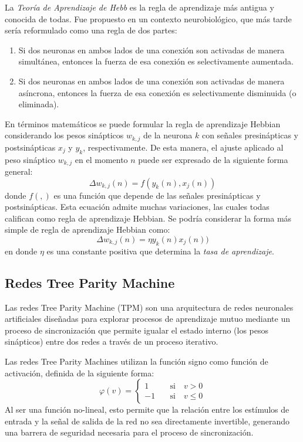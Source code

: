 La \textit{Teoría de Aprendizaje de Hebb} es la regla de aprendizaje más antigua y conocida de todas. Fue propuesto en un contexto neurobiológico, que más tarde sería reformulado como una regla de dos partes:
\begin{enumerate}
    \item Si dos neuronas en ambos lados de una conexión son activadas de manera simultánea, entonces la fuerza de esa conexión es selectivamente aumentada.
    \item Si dos neuronas en ambos lados de una conexión son activadas de manera asíncrona, entonces la fuerza de esa conexión es selectivamente disminuida (o eliminada).
\end{enumerate}
En términos matemáticos se puede formular la regla de aprendizaje Hebbian considerando los pesos sinápticos $w_{k,j}$ de la neurona $k$ con señales presinápticas y postsinápticas $x_j$ y $y_k$, respectivamente. De esta manera, el ajuste aplicado al peso sináptico $w_{k,j}$ en el momento $n$ puede ser expresado de la siguiente forma general:
$$\Delta w_{k,j}(n) = f(y_k(n), x_j(n))$$
donde $f(,)$ es una función que depende de las señales presinápticas y postsinápticas. Esta ecuación admite muchas variaciones, las cuales todas califican como regla de aprendizaje Hebbian. Se podría considerar la forma más simple de regla de aprendizaje Hebbian como:  
$$\Delta w_{k,j}(n) = \eta y_k(n) x_j(n))$$
en donde $\eta$ es una constante positiva que determina la \textit{tasa de aprendizaje}.

\subsection{Redes Tree Parity Machine}

Las redes Tree Parity Machine (TPM) son una arquitectura de redes neuronales artificiales diseñadas para explorar procesos de aprendizaje mutuo mediante un proceso de sincronización que permite igualar el estado interno (los pesos sinápticos) entre dos redes a través de un proceso iterativo.

Las redes Tree Parity Machines utilizan la función signo como función de activación, definida de la siguiente forma:
$$
\varphi(v) = \begin{cases}
    1 & \quad \text{si}\quad v > 0 \\
    -1 & \quad \text{si}\quad v \le 0
\end{cases} 
$$
Al ser una función no-lineal, esto permite que la relación entre los estímulos de entrada y la señal de salida de la red no sea directamente invertible, generando una barrera de seguridad necesaria para el proceso de sincronización.

